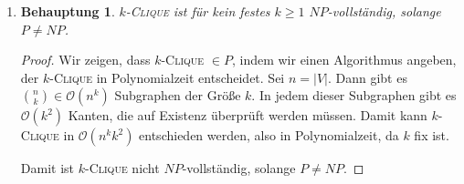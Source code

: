 \documentclass[a4paper]{scrartcl}
\newtheorem*{proposition}{Behauptung}
\newcommand{\Oh}{\mathcal{O}}
\begin{document}
\begin{enumerate}[label=\bfseries \arabic*.]
\begin{enumerate}
\begin{proof}
\begin{enumerate}
\begin{itemize}
                    \item $\Leftarrow$: \\
                        Sei $\overline{T'}$ ein \textsc{4D-Matching} für das
                        konstruierte Problem $\langle W,X,Y,Z,\overline{T}
                        \rangle$.
                        \begin{equation*}
                            T' = \left\{ (x,y,z)\ |\ (w,x,y,z) \in \overline{T'} \right\}
                        \end{equation*}
                        ist dann offensichtlich ein \textsc{3D-Matching} für
                        das ursprüngliche Problem. (Die geforderte Eigenschaft
                        bleibt für die restlichen drei Mengen bestehen, wenn
                        die erste Komponente weggelassen wird.)
                \end{itemize}
                Es gilt also \textsc{3D-Matching} $\leq_p$
                \textsc{4D-Matching}, letzteres ist also mindestens so schwer
                wie ersteres. Da wir von \textsc{3D-Matching} wissen, dass es
                $NP$-vollständig ist, folgt, dass \textsc{4D-Matching}
                $NP$-schwierig ist.

        \end{enumerate}
        Aus i. und ii. folgt, dass \textsc{4D-Matching} $NP$-vollständig ist.
    \end{proof}

    \item
        \begin{proposition}
            \textsc{$k$-Clique} ist für kein festes $k \geq 1$
            $NP$-vollständig, solange $P \neq NP$.
        \end{proposition}
        \begin{proof}
            Wir zeigen, dass \textsc{$k$-Clique} $\in P$, indem wir einen
            Algorithmus angeben, der \textsc{$k$-Clique} in Polynomialzeit
            entscheidet.
            Sei $n = |V|$.
            Dann gibt es $\binom{n}{k} \in \Oh(n^k)$ Subgraphen der Größe $k$.
            In jedem dieser Subgraphen gibt es $\Oh(k^2)$ Kanten, die auf
            Existenz überprüft werden müssen.
            Damit kann \textsc{$k$-Clique} in $\Oh(n^kk^2)$ entschieden werden,
            also in Polynomialzeit, da $k$ fix ist.

            Damit ist \textsc{$k$-Clique} nicht $NP$-vollständig, solange $P \neq NP$.
        \end{proof}


\end{enumerate}
\end{enumerate}
\end{document}
